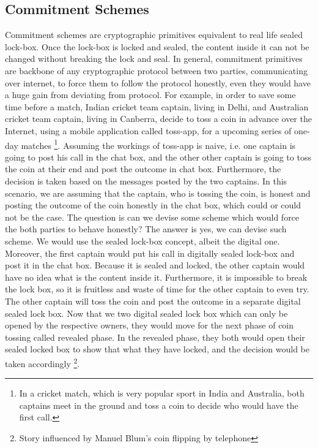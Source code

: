 \begin{enumerate}
{     \subsection{Commitment Schemes}   
     \label{sec:commscheme}
      Commitment schemes are cryptographic primitives equivalent to real life sealed lock-box.
      Once the lock-box is locked and sealed, the content inside it can not be changed without breaking the lock and seal. 
      In general, commitment primitives 
      are backbone of any cryptographic protocol between two parties, communicating over internet, to force them  to  follow the 
      protocol honestly, even they would have a huge gain from deviating 
      from protocol. For example, in order to save some time before a match, Indian cricket team captain, living in Delhi, and Australian cricket 
      team captain, living in Canberra, decide 
      to toss a coin in advance over the Internet, using a mobile application  called toss-app, for a  upcoming series of one-day matches
      \footnote{
      In a cricket match, which is very popular sport in India and Australia, both captains meet in the ground and toss a coin to 
      decide who would have the first call.}.  Assuming the workings of toss-app is naive, i.e. one captain is going to post
      his call in the chat box, and the other other captain is going to toss the coin at their end and post the outcome in chat box. 
      Furthermore, the decision is taken based on the messages posted by the two captains. In this scenario, we are assuming that 
      the captain, who is tossing the coin, is honest and posting the outcome of the coin honestly in the chat box, which could or 
      could not be the case.  The question is can we devise some scheme which would force the both parties to behave honestly? 
      The answer is yes, we can devise such scheme. We would use the sealed lock-box concept, albeit the digital one. Moreover, 
      the first captain would put his call in digitally sealed lock-box and post it in the chat box. Because it is sealed and 
      locked, the other captain would have no idea what is the content inside it. Furthermore, it is impossible to break 
      the lock box, so it is fruitless and waste of time for the other captain to even try. The other captain will toss the coin 
      and post the outcome in a separate digital sealed lock box. Now that we two digital sealed lock box which can 
      only be opened by the respective owners, they would move for the next phase of coin tossing  called revealed phase. 
      In the revealed phase, they both would open their sealed locked box to show that what they have locked, 
      and the decision would be taken accordingly \footnote{Story influenced by Manuel Blum's coin flipping by telephone}. 
      
}
\end{enumerate}
